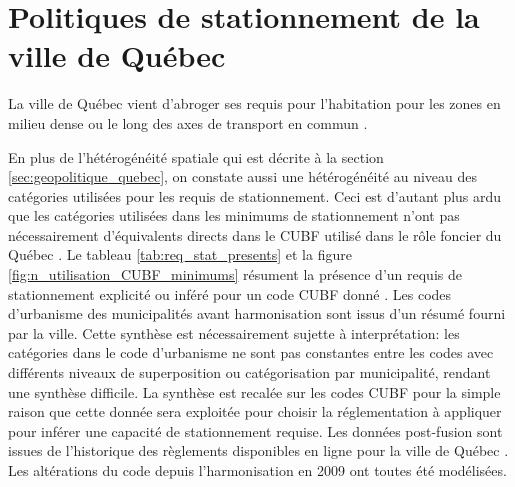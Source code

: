 \section{Politiques de stationnement de la ville de Québec} \label{sec:politiques_stationnement}

La ville de Québec vient d'abroger ses requis pour l'habitation pour les zones en milieu dense ou le long des axes de transport en commun \parencite{ville_de_quebec_rvq_2024}.\par
  En plus de l'hétérogénéité spatiale qui est décrite à la section \ref{sec:geopolitique_quebec}, on constate aussi une hétérogénéité au niveau des catégories utilisées pour les requis de stationnement. Ceci est d'autant plus ardu que les catégories utilisées dans les minimums de stationnement n'ont pas nécessairement d'équivalents directs dans le \ac{CUBF} utilisé dans le rôle foncier du Québec \parencite[Annexe 2C.1]{gouvernement_du_quebec_manuel_2024}. Le tableau \ref{tab:req_stat_presents} et la figure \ref{fig:n_utilisation_CUBF_minimums} résument la présence d'un requis de stationnement explicité ou inféré pour un code \ac{CUBF} donné \parencite{ville_de_quebec_rvq_2024,ville_de_quebec_reglement_1995}. Les codes d'urbanisme des municipalités avant harmonisation sont issus d'un résumé fourni par la ville\parencite{ville_de_quebec_residentiel_2008,ville_de_quebec_commercial_2008}. Cette synthèse est nécessairement sujette à interprétation: les catégories dans le code d'urbanisme ne sont pas constantes entre les codes avec différents niveaux de superposition ou catégorisation par municipalité, rendant une synthèse difficile. La synthèse est recalée sur les codes \ac{CUBF} pour la simple raison que cette donnée sera exploitée pour choisir la réglementation à appliquer pour inférer une capacité de stationnement requise. Les données post-fusion sont issues de l'historique des règlements disponibles en ligne pour la ville de Québec \parencite{ville_de_quebec_reglement_1995,ville_de_quebec_rvq_2009}. Les altérations du code \parencite{ville_de_quebec_rvq_2016,ville_de_quebec_rvq_2017,ville_de_quebec_rvq_2018,ville_de_quebec_rvq_2018-1,ville_de_quebec_rvq_2019,ville_de_quebec_rvq_2022,ville_de_quebec_rvq_2023,ville_de_quebec_rvq_2023-1,ville_de_quebec_rvq_2024} depuis l'harmonisation en 2009 ont toutes été modélisées.

